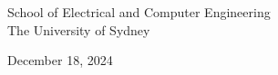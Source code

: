 \begin{titlepage}
\begin{flushleft}
\begin{center}
        \vspace{0.8cm}

        School of Electrical and Computer Engineering\\
        The University of Sydney

        \vspace{0.8cm}
        
        December 18, 2024
        
        \vspace{2cm}
        
        \end{center}
        
    \end{flushleft}
    

\end{titlepage}

